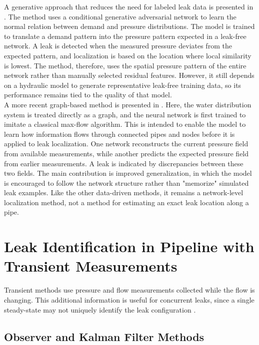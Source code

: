 A generative approach that reduces the need for labeled leak data is presented in \cite{rajabi2023}. The method uses a conditional generative adversarial network to learn the normal relation between demand and pressure distributions. The model is trained to translate a demand pattern into the pressure pattern expected in a leak-free network. A leak is detected when the measured pressure deviates from the expected pattern, and localization is based on the location where local similarity is lowest. The method, therefore, uses the spatial pressure pattern of the entire network rather than manually selected residual features. However, it still depends on a hydraulic model to generate representative leak-free training data, so its performance remains tied to the quality of that model.\\

A more recent graph-based method is presented in \cite{zhang2026aignn}. Here, the water distribution system is treated directly as a graph, and the neural network is first trained to imitate a classical max-flow algorithm. This is intended to enable the model to learn how information flows through connected pipes and nodes before it is applied to leak localization. One network reconstructs the current pressure field from available measurements, while another predicts the expected pressure field from earlier measurements. A leak is indicated by discrepancies between these two fields. The main contribution is improved generalization, in which the model is encouraged to follow the network structure rather than "memorize" simulated leak examples. Like the other data-driven methods, it remains a network-level localization method, not a method for estimating an exact leak location along a pipe.

\section{Leak Identification in Pipeline with Transient Measurements}
\label{sec:lit:transients}

Transient methods use pressure and flow measurements collected while the flow is changing. This additional information is useful for concurrent leaks, since a single steady-state may not uniquely identify the leak configuration \cite{verde2004}.

\subsection*{Observer and Kalman Filter Methods}

